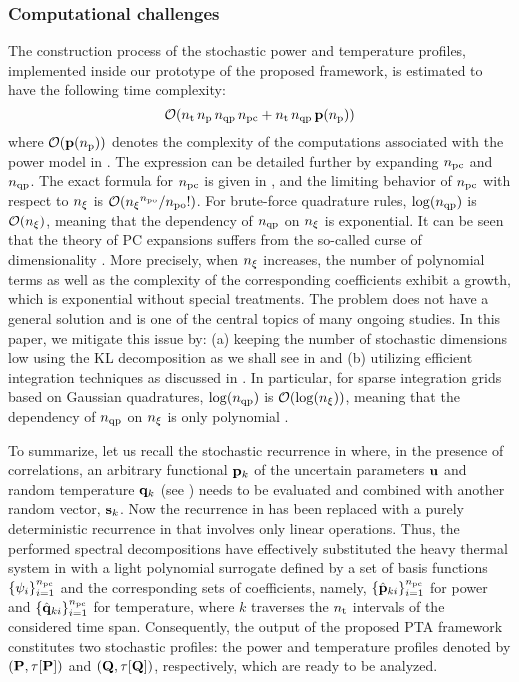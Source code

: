 \subsubsection{Computational challenges} 
The construction process of the stochastic power and temperature profiles, implemented inside our prototype of the proposed framework, is estimated to have the following time complexity:
\[
  \mathcal{O}({n_\text{t}} \, {n_\text{p}} \, {n_\text{qp}} \, {n_\text{pc}} + {n_\text{t}} \, {n_\text{qp}} \, \mathbf{p}({n_\text{p}}))
\]
where $\mathcal{O}(\mathbf{p}({n_\text{p}}))$ denotes the complexity of the computations associated with the power model in .
The expression can be detailed further by expanding ${n_\text{pc}}$ and ${n_\text{qp}}$.
The exact formula for ${n_\text{pc}}$ is given in , and the limiting behavior of ${n_\text{pc}}$ with respect to ${n_\xi}$ is $\mathcal{O}({n_\xi}^{n_\text{po}} / {n_\text{po}}!)$.
For brute-force quadrature rules, $\log({n_\text{qp}})$ is $\mathcal{O}({n_\xi})$, meaning that the dependency of ${n_\text{qp}}$ on ${n_\xi}$ is exponential.
It can be seen that the theory of PC expansions suffers from the so-called curse of dimensionality \cite{xiu2010, eldred2008}.
More precisely, when ${n_\xi}$ increases, the number of polynomial terms as well as the complexity of the corresponding coefficients exhibit a growth, which is exponential without special treatments.
The problem does not have a general solution and is one of the central topics of many ongoing studies.
In this paper, we mitigate this issue by: (a) keeping the number of stochastic dimensions low using the KL decomposition as we shall see in  and (b) utilizing efficient integration techniques as discussed in .
In particular, for sparse integration grids based on Gaussian quadratures, $\log({n_\text{qp}})$ is $\mathcal{O}(\log({n_\xi}))$, meaning that the dependency of ${n_\text{qp}}$ on ${n_\xi}$ is only polynomial \cite{heiss2008}.

To summarize, let us recall the stochastic recurrence in  where, in the presence of correlations, an arbitrary functional $\mathbf{p}_k$ of the uncertain parameters $\mathbf{u}$ and random temperature $\mathbf{q}_k$ (see ) needs to be evaluated and combined with another random vector, $\mathbf{s}_k$.
Now the recurrence in  has been replaced with a purely deterministic recurrence in  that involves only linear operations.
Thus, the performed spectral decompositions have effectively substituted the heavy thermal system in  with a light polynomial surrogate defined by a set of basis functions $\{ \psi_i \}_{i = 1}^{n_\text{pc}}$ and the corresponding sets of coefficients, namely, $\{ \hat{\mathbf{p}}_{ki} \}_{i = 1}^{n_\text{pc}}$ for power and $\{ \hat{\mathbf{q}}_{ki} \}_{i = 1}^{n_\text{pc}}$ for temperature, where $k$ traverses the ${n_\text{t}}$ intervals of the considered time span.
Consequently, the output of the proposed PTA framework constitutes two stochastic profiles: the power and temperature profiles denoted by $\profileP$ and $\profileT$, respectively, which are ready to be analyzed.

